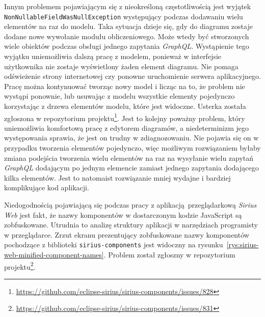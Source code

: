 Innym problemem pojawiającym się z nieokreśloną częstotliwością jest wyjątek
\texttt{NonNullableFieldWasNullException} występujący podczas dodawaniu wielu
elementów na raz do modelu. Taka sytuacja dzieje się, gdy do diagramu zostaje
dodane nowe wywołanie modułu obliczeniowego. Może wtedy być stworzonych wiele
obiektów podczas obsługi jednego zapytania \emph{GraphQL}. Wystąpienie tego
wyjątku uniemożliwia dalszą pracę z modelem, ponieważ w interfejsie użytkownika
nie zostaje wyświetlony żaden element diagramu. Nie pomaga odświeżenie strony
internetowej czy ponowne uruchomienie serwera aplikacyjnego. Pracę można
kontynuować tworząc nowy model i licząc na to, że problem nie wystąpi ponownie,
lub usuwając z modelu wszystkie elementy pojedynczo korzystając z drzewa
elementów modelu, które jest widoczne. Usterka została zgłoszona w repozytorium
projektu\footnote{
	\url{https://github.com/eclipse-sirius/sirius-components/issues/828}
}. Jest to kolejny poważny problem, który uniemożliwia komfortową pracę z
edytorem diagramów, a niedeterminizm jego występowania sprawia, że jest on
trudny w zdiagnozowaniu. Nie pojawia się on w przypadku tworzenia elementów
pojedynczo, więc możliwym rozwiązaniem byłaby zmiana podejścia tworzenia wielu
elementów na raz na wysyłanie wielu zapytań \emph{GraphQL} dodającym po jednym
elemencie zamiast jednego zapytania dodającego kilka elementów. Jest to
natomaist rozwiązanie mniej wydajne i bardziej komplikujące kod aplikacji.

Niedogodnością pojawiającą się podczas pracy z aplikacją przeglądarkową
\emph{Sirius Web} jest fakt, że nazwy komponentów w dostarczonym kodzie
JavaScript są zobfuskowane. Utrudnia to analizę struktury aplikacji w
narzędziach programisty w przeglądarce. Zrzut ekranu prezentujący zobfuskowane
nazwy komponentów pochodzące z biblioteki \texttt{sirius-components} jest
widoczny na rysunku~\ref{rys:sirius-web-minified-component-names}. Problem
został zgłoszny w repozytorium
projektu\footnote{
	\url{https://github.com/eclipse-sirius/sirius-components/issues/831}
}.

